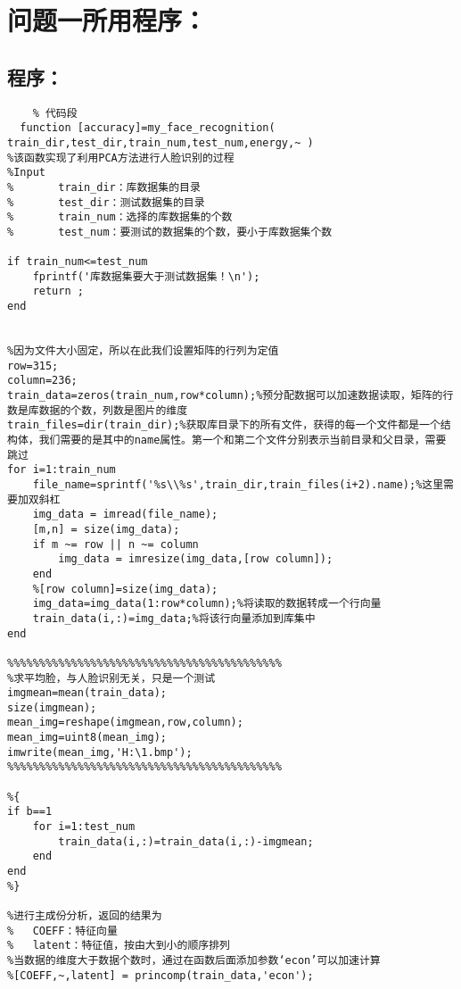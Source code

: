 \documentclass[12pt]{article}
\begin{document}
   \begin{thebibliography}{5}
   
    \end{thebibliography}


 

  {\centering\section{问题一所用程序：}}
  \subsection{程序：}
  \begin{lstlisting}
    % 代码段
  function [accuracy]=my_face_recognition( train_dir,test_dir,train_num,test_num,energy,~ )
%该函数实现了利用PCA方法进行人脸识别的过程
%Input
%       train_dir：库数据集的目录
%       test_dir：测试数据集的目录
%       train_num：选择的库数据集的个数
%       test_num：要测试的数据集的个数，要小于库数据集个数

if train_num<=test_num
    fprintf('库数据集要大于测试数据集！\n');
    return ;
end


%因为文件大小固定，所以在此我们设置矩阵的行列为定值
row=315;
column=236;
train_data=zeros(train_num,row*column);%预分配数据可以加速数据读取，矩阵的行数是库数据的个数，列数是图片的维度
train_files=dir(train_dir);%获取库目录下的所有文件，获得的每一个文件都是一个结构体，我们需要的是其中的name属性。第一个和第二个文件分别表示当前目录和父目录，需要跳过
for i=1:train_num
    file_name=sprintf('%s\\%s',train_dir,train_files(i+2).name);%这里需要加双斜杠
    img_data = imread(file_name);
    [m,n] = size(img_data);
    if m ~= row || n ~= column
        img_data = imresize(img_data,[row column]);
    end
    %[row column]=size(img_data);
    img_data=img_data(1:row*column);%将读取的数据转成一个行向量
    train_data(i,:)=img_data;%将该行向量添加到库集中
end

%%%%%%%%%%%%%%%%%%%%%%%%%%%%%%%%%%%%%%%%%%%
%求平均脸，与人脸识别无关，只是一个测试
imgmean=mean(train_data);
size(imgmean);
mean_img=reshape(imgmean,row,column);
mean_img=uint8(mean_img);
imwrite(mean_img,'H:\1.bmp');
%%%%%%%%%%%%%%%%%%%%%%%%%%%%%%%%%%%%%%%%%%%

%{
if b==1
    for i=1:test_num
        train_data(i,:)=train_data(i,:)-imgmean;
    end
end
%}

%进行主成份分析，返回的结果为
%   COEFF：特征向量
%   latent：特征值，按由大到小的顺序排列
%当数据的维度大于数据个数时，通过在函数后面添加参数‘econ’可以加速计算
%[COEFF,~,latent] = princomp(train_data,'econ');


\end{lstlisting}
\end{document}
